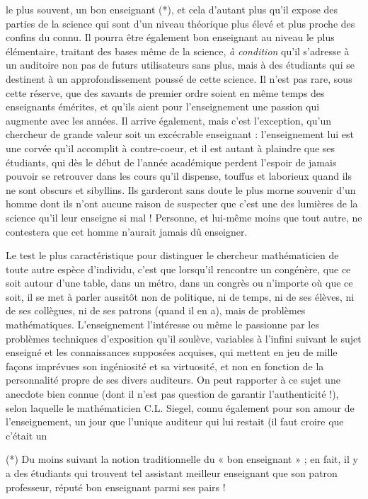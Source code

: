 \documentclass[11pt,a4paper]{article}
\begin{document}
le plus souvent, un bon enseignant (*), et cela d'autant plus qu'il expose des
parties de la science qui sont d'un niveau théorique plus élevé et plus
proche des confins du connu. Il pourra être également bon enseignant au niveau
le plus élémentaire, traitant des bases même de la science, \emph{à condition}
qu'il s'adresse à un auditoire non pas de futurs utilisateurs sans plus,
mais à des étudiants qui se destinent à un approfondissement poussé de cette
science. Il n'est pas rare, sous cette réserve, que des savants de premier
ordre soient en même temps des enseignants émérites, et qu'ils aient pour
l'enseignement une passion qui augmente avec les années. Il arrive également,
mais c'est l'exception, qu'un chercheur de grande valeur soit un excécrable
enseignant : l'enseignement lui est une corvée qu'il accomplit à contre-coeur,
et il est autant à plaindre que ses étudiants, qui dès le début de l'année
académique perdent l'espoir de jamais pouvoir se retrouver dans les cours
qu'il dispense, touffus et laborieux quand ils ne sont obscurs et sibyllins.
Ils garderont sans doute le plus morne souvenir d'un homme dont ils n'ont
aucune raison de suspecter que c'est une des lumières de la science qu'il
leur enseigne si mal ! Personne, et lui-même moins que tout autre, ne
contestera que cet homme n'aurait jamais dû enseigner.

Le test le plus caractéristique pour distinguer le chercheur
mathématicien de toute autre espèce d'individu, c'est que lorsqu'il rencontre
un congénère, que ce soit autour d'une table, dans un métro, dans un congrès
ou n'importe où que ce soit, il se met à parler aussitôt non de politique,
ni de temps, ni de ses élèves, ni de ses collègues, ni de ses patrons (quand
il en a), mais de problèmes mathématiques. L'enseignement l'intéresse ou
même le passionne par les problèmes techniques d'exposition qu'il soulève,
variables à l'infini suivant le sujet enseigné et les connaissances supposées
acquises, qui mettent en jeu de mille façons imprévues son ingéniosité et
sa virtuosité, et non en fonction de la personnalité propre de ses divers
auditeurs. On peut rapporter à ce sujet une anecdote bien connue (dont il
n'est pas question de garantir l'authenticité !), selon laquelle le
mathématicien C.L. Siegel, connu également pour son amour de l'enseignement,
un jour que l'unique auditeur qui lui restait (il faut croire que c'était un

(*) Du moins suivant la notion traditionnelle du « bon enseignant » ; en fait, il
y a des étudiants qui trouvent tel assistant meilleur enseignant que son
patron professeur, réputé bon enseignant parmi ses pairs !
\end{document}
